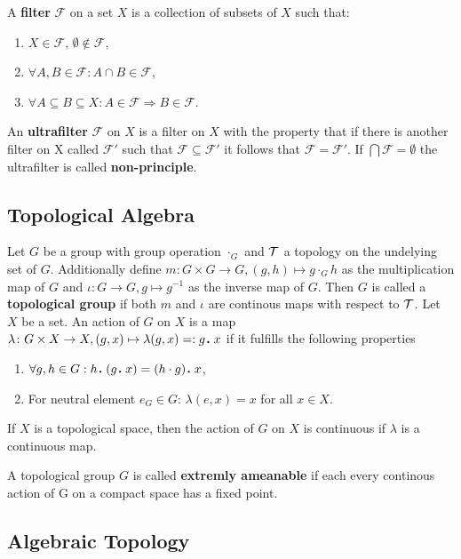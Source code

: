 \begin{defin}
  A \textbf{filter} $\mathcal{F}$ on a set $X$ is a collection of subsets of $X$ such that:
  \begin{enumerate}
    \item $X \in \mathcal{F}$, $\emptyset \notin \mathcal{F}$,
    \item $\forall A, B \in \mathcal{F}\colon A\cap B \in \mathcal{F}$,
    \item $\forall A \subseteq B \subseteq X: A \in \mathcal{F} \Rightarrow B \in \mathcal{F}$.
  \end{enumerate}
\end{defin}

\begin{defin} 
  An \textbf{ultrafilter} $\mathcal{F}$ on $X$ is a filter on $X$ with the property that if there is another filter on X called $\mathcal{F}'$ such that $\mathcal{F} \subseteq \mathcal{F}'$ it follows that $\mathcal{F} = \mathcal{F}'$.
  If $\bigcap \mathcal{F} = \emptyset$ the ultrafilter is called \textbf{non-principle}.
\end{defin}

\subsection{Topological Algebra}

\begin{defin}
  Let $G$ be a group with group operation $\cdot_G$ and $\mathcal{T}$ a topology on the undelying set of $G$. Additionally define $m\colon G \times G \to G, (g, h) \mapsto g \cdot_G h$ as the multiplication map of $G$ and $\iota\colon G \to G, g \mapsto g^{-1}$ as the inverse map of $G$. Then $G$ is called a \textbf{topological group} if both $m$ and $\iota$ are continous maps with respect to $\mathcal{T}$.
  Let $X$ be a set. An action of $G$ on $X$ is a map $\lambda\colon G\times X \to X, (g, x) \mapsto \lambda(g, x) =: g \anddot x$ if it fulfills the following properties
  \begin{enumerate}
    \item $\forall g, h \in G: h \anddot (g \anddot x) = (h \cdot g) \anddot x$,
    \item For neutral element $e_G \in G$: $\lambda(e, x) = x$ for all $x \in X$.
  \end{enumerate}
  If $X$ is a topological space, then the action of $G$ on $X$ is continuous if $\lambda$ is a continuous map.
\end{defin}

\begin{defin}
  A topological group $G$ is called \textbf{extremly ameanable} if each every continous action of G on a compact space has a fixed point.
\end{defin}

\subsection{Algebraic Topology}
